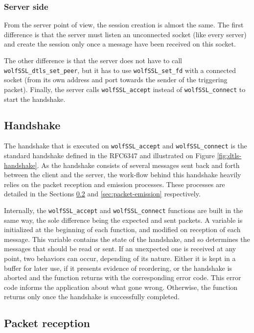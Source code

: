 \subsubsection{Server side}

From the server point of view, the session creation is almost the same. The first difference is that the server must listen an unconnected socket (like every server) and create the session only once a message have been received on this socket.

The other difference is that the server does not have to call \texttt{wolfSSL\_dtls\_set\_peer}, but it has to use \texttt{wolfSSL\_set\_fd} with a connected socket (from its own address and port towards the sender of the triggering packet). Finally, the server calls \texttt{wolfSSL\_accept} instead of \texttt{wolfSSL\_connect} to start the handshake.

\subsection{Handshake}

The handshake that is executed on \texttt{wolfSSL\_accept} and \texttt{wolfSSL\_connect} is the standard handshake defined in the RFC6347\cite{rfc6347} and illustrated on Figure \ref{fig:dtls-handshake}. As the handshake consists of several messages sent back and forth between the client and the server, the work-flow behind this handshake heavily relies on the packet reception and emission processes. These processes are detailed in the Sections \ref{sec:packet-reception} and \ref{sec:packet-emission} respectively.

Internally, the \texttt{wolfSSL\_accept} and \texttt{wolfSSL\_connect} functions are built in the same way, the sole difference being the expected and sent packets. A variable is initialized at the beginning of each function, and modified on reception of each message. This variable contains the state of the handshake, and so determines the messages that should be read or sent. If an unexpected one is received at any point, two behaviors can occur, depending of its nature. Either it is kept in a buffer for later use, if it presents evidence of reordering, or the handshake is aborted and the function returns with the corresponding error code. This error code informs the application about what gone wrong. Otherwise, the function returns only once the handshake is successfully completed.

\subsection{Packet reception}\label{sec:packet-reception}

